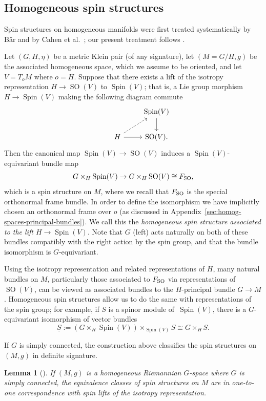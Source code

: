 \documentclass[10pt,a4paper]{amsart}
\numberwithin{equation}{section}
\newtheorem{Lemma}[Theorem]{Lemma}
\newcommand{\Sbundle}{\underline{S}}
\newcommand{\1}{\mathbbm{1}}
\DeclareMathOperator{\Spin}{Spin}
\DeclareMathOperator{\SO}{SO}
\begin{document}
\subsection{Homogeneous spin structures}
\label{sec:homogeneous-spin-mfld}

Spin structures on homogeneous manifolds were first treated systematically by B\"ar \cite{Bar1992} and by Cahen et al.\ \cite{Cahen1993}; our present treatment follows \cite{Figueroa-OFarrill2017_1}.

Let $(G,H,\eta)$ be a metric Klein pair (of any signature), let $(M=G/H,g)$ be the associated homogeneous space, which we assume to be oriented, and let $V=T_oM$ where $o=H$. Suppose that there exists a lift of the isotropy representation $H\to\SO(V)$ to $\Spin(V)$; that is, a Lie group morphism $H\to\Spin(V)$ making the following diagram commute
\[
\begin{tikzcd}
	&	& \Spin(V) \ar[d]	\\
	& H	\ar[r] \ar[ur,dashed]& \SO(V).
\end{tikzcd}
\]
Then the canonical map $\Spin(V)\to\SO(V)$ induces a $\Spin(V)$-equivariant bundle map
\[
	G\times_H\Spin(V)\to G\times_H\SO(V) \cong F_{\rm SO},
\]
which is a spin structure on $M$, where we recall that $F_{\rm SO}$ is the special orthonormal frame bundle. In order to define the isomorphism we have implicitly chosen an orthonormal frame over $o$ (as discussed in Appendix~\ref{sec:homog-spaces-principal-bundles}). We call this the \emph{homogeneous spin structure associated to the lift $H\to\Spin(V)$}. Note that $G$ (left) acts naturally on both of these bundles compatibly with the right action by the spin group, and that the bundle isomorphism is $G$-equivariant.

Using the isotropy representation and related representations of $H$, many natural bundles on $M$, particularly those associated to $F_{\rm SO}$ via representations of $\SO(V)$, can be viewed as associated bundles to the $H$-principal bundle $G\to M$. Homogeneous spin structures allow us to do the same with representations of the spin group; for example, if $S$ is a spinor module of~$\Spin(V)$, there is a $G$-equivariant isomorphism of vector bundles
\[
	\Sbundle := (G\times_H\Spin(V))\times_{\Spin(V)} S \cong G\times_H S.
\]

If $G$ is simply connected, the construction above classifies the spin structures on $(M,g)$ in definite signature.

\begin{Lemma}[\cite{Bar1992,Cahen1993}]\label{lemma:homogeneous-spin}
	If $(M,g)$ is a homogeneous Riemannian $G$-space where $G$ is simply connected, the equivalence classes of spin structures on $M$ are in one-to-one correspondence with spin lifts of the isotropy representation.
\end{Lemma}
\end{document}
